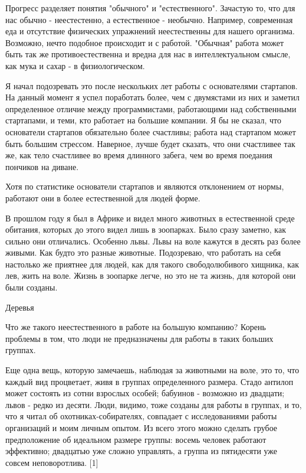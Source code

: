 \documentclass[ebook,12pt,oneside,openany]{memoir}
\date{}
\begin{document}
\maketitle

Прогресс разделяет понятия "обычного" и "естественного". Зачастую то,
что для нас обычно - неестестенно, а естественное - необычно.
Например, современная еда и отсутствие физических упражнений
неестественны для нашего организма. Возможно, нечто подобное
происходит и с работой. "Обычная" работа может быть так же
противоестественна и вредна для нас в интеллектуальном смысле, как
мука и сахар - в физиологическом.

Я начал подозревать это после нескольких лет работы с основателями
стартапов. На данный момент я успел поработать более, чем с двумястами
из них и заметил определенное отличие между программистами,
работающими над собственными стартапами, и теми, кто работает на
большие компании. Я бы не сказал, что основатели стартапов обязательно
более счастливы; работа над стартапом может быть большим стрессом.
Наверное, лучше будет сказать, что они счастливее так же, как тело
счастливее во время длинного забега, чем во время поедания пончиков на
диване.

Хотя по статистике основатели стартапов и являются отклонением от
нормы, работают они в более естественной для людей форме.

В прошлом году я был в Африке и видел много животных в естественной
среде обитания, которых до этого видел лишь в зоопарках. Было сразу
заметно, как сильно они отличались. Особенно львы. Львы на воле
кажутся в десять раз более живыми. Как будто это разные животные.
Подозреваю, что работать на себя настолько же приятнее для людей, как
для такого свободолюбивого хищника, как лев, жить на воле. Жизнь в
зоопарке легче, но это не та жизнь, для которой они были созданы.

Деревья

Что же такого неестественного в работе на большую компанию? Корень
проблемы в том, что люди не предназначены для работы в таких больших
группах.

Еще одна вещь, которую замечаешь, наблюдая за животными на воле, это
то, что каждый вид процветает, живя в группах определенного размера.
Стадо антилоп может состоять из сотни взрослых особей; бабуинов -
возможно из двадцати; львов - редко из десяти. Люди, видимо, тоже
созданы для работы в группах, и то, что я читал об
охотниках-собирателях, совпадает с исследованиями работы организаций и
моим личным опытом. Из всего этого можно сделать грубое предположение
об идеальном размере группы: восемь человек работают эффективно;
двадцатью уже сложно управлять, а группа из пятидесяти уже совсем
неповоротлива. [1]
\end{document}
